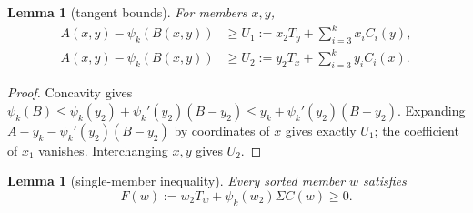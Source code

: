 \documentclass[11pt]{article}
\newtheorem{lemma}[theorem]{Lemma}
\theoremstyle{definition}
\theoremstyle{remark}
\begin{document}
\begin{lemma}[tangent bounds]\label{lem:add-tangent}
For members $x,y$,
\begin{align*}
 A(x,y)-\psi_k(B(x,y))&\ge
 U_1:=x_2T_y+\sum_{i=3}^k x_iC_i(y),\\
 A(x,y)-\psi_k(B(x,y))&\ge
 U_2:=y_2T_x+\sum_{i=3}^k y_iC_i(x).
\end{align*}
\end{lemma}

\begin{proof}
Concavity gives
$\psi_k(B)\le\psi_k(y_2)+\psi_k'(y_2)(B-y_2)
\le y_k+\psi_k'(y_2)(B-y_2)$.
Expanding $A-y_k-\psi_k'(y_2)(B-y_2)$ by coordinates of $x$ gives
exactly $U_1$; the coefficient of $x_1$ vanishes.
Interchanging $x,y$ gives $U_2$.
\end{proof}

\begin{lemma}[single-member inequality]\label{lem:add-single}
Every sorted member $w$ satisfies
\begin{equation}\label{eq:add-single}
 F(w):=w_2T_w+\psi_k(w_2)\Sigma C(w)\ge0.
\end{equation}
\end{lemma}
\end{document}
